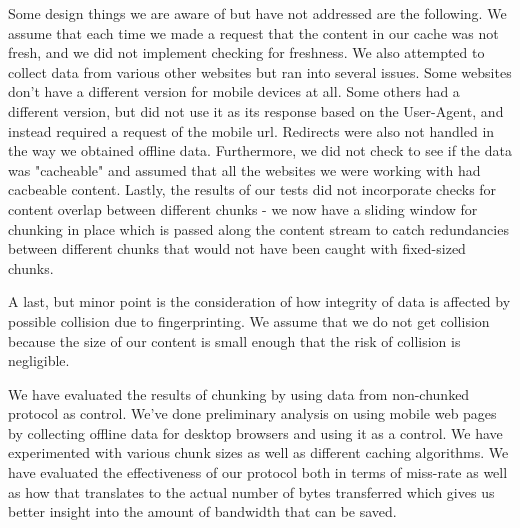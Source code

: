 Some design things we are aware of but have not addressed are the following. We assume that each time we made a request that the content in our cache was not fresh, and we did not implement checking for freshness. We also attempted to collect data from various other websites but ran into several issues. Some websites don't have a different version for mobile devices at all. Some others had a different version, but did not use it as its response based on the User-Agent, and instead required a request of the mobile url. Redirects were also not handled in the way we obtained offline data. Furthermore, we did not check to see if the data was "cacheable" and assumed that all the websites we were working with had cacbeable content. Lastly, the results of our tests did not incorporate checks for content overlap between different chunks -  we now have a sliding window for chunking in place which is passed along the content stream to catch redundancies between different chunks that would not have been caught with fixed-sized chunks. 

A last, but minor point is the consideration of how integrity of data is affected by possible collision due to fingerprinting. We assume that we do not get collision because the size of our content is small enough that the risk of collision is negligible. 

We have evaluated the results of chunking by using data from non-chunked protocol as control. We've done preliminary analysis on using mobile web pages by collecting offline data for desktop browsers and using it as a control. We have experimented with various chunk sizes as well as different caching algorithms. We have evaluated the effectiveness of our protocol both in terms of miss-rate as well as how that translates to the actual number of bytes transferred which gives us better insight into the amount of bandwidth that can be saved. 
